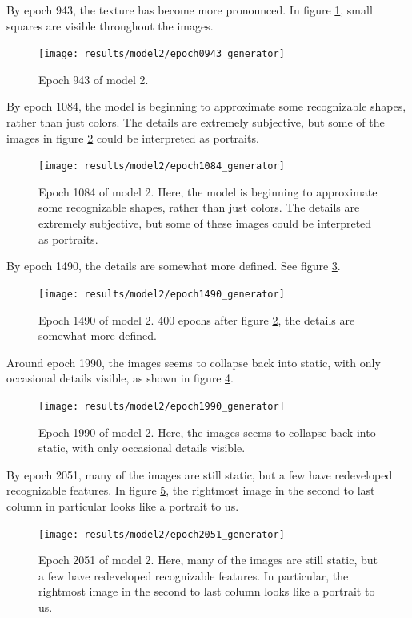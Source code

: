 \documentclass[11pt,letterpaper]{article}
\begin{document}
				By epoch 943, the texture has become more pronounced.
				In figure \ref{fig:cgvg:epoch0943generator}, small squares are visible throughout the images.
				\begin{figure}
					\centering
					\texttt{[image: results/model2/epoch0943\_generator]}
					\caption{Epoch 943 of model 2.}
					\label{fig:cgvg:epoch0943generator}
				\end{figure}

				By epoch 1084, the model is beginning to approximate some recognizable shapes, rather than just colors.
				The details are extremely subjective, but some of the images in figure \ref{fig:cgvg:epoch1084generator} could be interpreted as portraits.
				\begin{figure}
					\centering
					\texttt{[image: results/model2/epoch1084\_generator]}
					\caption{Epoch 1084 of model 2. Here, the model is beginning to approximate some recognizable shapes, rather than just colors. The details are extremely subjective, but some of these images could be interpreted as portraits.}
					\label{fig:cgvg:epoch1084generator}
				\end{figure}

				By epoch 1490, the details are somewhat more defined.
				See figure \ref{fig:cgvg:epoch1490generator}.
				\begin{figure}
					\centering
					\texttt{[image: results/model2/epoch1490\_generator]}
					\caption{Epoch 1490 of model 2. 400 epochs after figure \ref{fig:cgvg:epoch1084generator}, the details are somewhat more defined.}
					\label{fig:cgvg:epoch1490generator}
				\end{figure}

				Around epoch 1990, the images seems to collapse back into static, with only occasional details visible, as shown in figure \ref{fig:cgvg:epoch1990generator}.
				\begin{figure}
					\centering
					\texttt{[image: results/model2/epoch1990\_generator]}
					\caption{Epoch 1990 of model 2. Here, the images seems to collapse back into static, with only occasional details visible.}
					\label{fig:cgvg:epoch1990generator}
				\end{figure}

				By epoch 2051, many of the images are still static, but a few have redeveloped recognizable features.
				In figure \ref{fig:cgvg:epoch2051generator}, the rightmost image in the second to last column in particular looks like a portrait to us.
				\begin{figure}
					\centering
					\texttt{[image: results/model2/epoch2051\_generator]}
					\caption{Epoch 2051 of model 2. Here,  many of the images are still static, but a few have redeveloped recognizable features. In particular, the rightmost image in the second to last column looks like a portrait to us.}
					\label{fig:cgvg:epoch2051generator}
				\end{figure}
\end{document}

